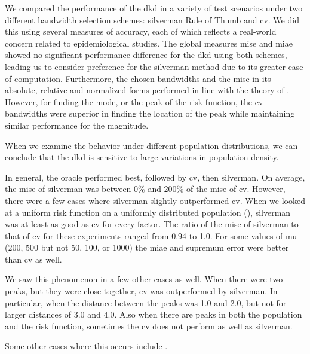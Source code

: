 


We compared the performance of the \acrlong{dkd} in a variety of test scenarios
under two different bandwidth selection schemes:
\gls{silverman} Rule of Thumb and \acrlong{cv}.
We did this using several measures of accuracy,
each of which reflects a real-world concern related to epidemiological studies.
The global measures \gls{mise} and \gls{miae} showed no significant performance difference
for the \gls{dkd} using both schemes,
leading us to consider preference for the \gls{silverman} method due to its greater ease of computation.
Furthermore,
the chosen bandwidths and the \gls{mise} in its absolute,
relative and normalized forms performed in line with the theory of
.
However,
for finding the mode,
or the peak of the risk function,
the \gls{cv} bandwidths were superior in finding the location of the peak
while maintaining similar performance for the magnitude.

When we examine the behavior under different population distributions,
we can conclude that the \gls{dkd} is sensitive to large variations in population density.

In general, the \gls{oracle} performed best, followed by \gls{cv}, then \gls{silverman}.
On average, the \gls{mise} of \gls{silverman} was between 0\% and 200\% of the \gls{mise} of \gls{cv}.
However, there were a few cases where \gls{silverman} slightly outperformed \gls{cv}.
When we looked at a uniform risk function on a uniformly distributed population (), \gls{silverman} was at least as good as \gls{cv} for every \gls{factor}.
The ratio of the \gls{mise} of \gls{silverman} to that of \gls{cv} for these experiments ranged from 0.94 to 1.0.
For some values of \gls{mu} (200, 500 but not 50, 100, or 1000) the \gls{miae} and \gls{supremum error} were better than \gls{cv} as well.

We saw this phenomenon in a few other cases as well.
When there were two peaks, but they were close together, \gls{cv} was outperformed by \gls{silverman}.
In particular, when the distance between the peaks was 1.0 and 2.0, but not for larger distances of 3.0 and 4.0.
Also when there are peaks in both the population and the risk function, sometimes the \gls{cv} does not perform as well as \gls{silverman}.

Some other cases where this occurs include .